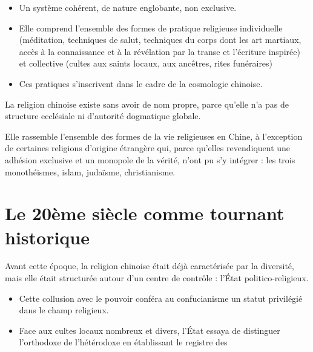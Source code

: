 \begin{Ex}
    
\end{Ex}

\begin{Ex}
    
\end{Ex}


\begin{Def}
    \begin{itemize}
        \item 	Un système cohérent, de nature englobante, non exclusive.
\item 	Elle comprend l’ensemble des formes de pratique religieuse individuelle (méditation, techniques de salut, techniques du corps dont les art martiaux, accès à la connaissance et à la révélation par la transe et l’écriture inspirée) et collective (cultes aux saints locaux, aux ancêtres, rites funéraires)
\item 	Ces pratiques s’inscrivent dans le cadre de la cosmologie chinoise.

    \end{itemize}
\end{Def}

\begin{Prop}
La religion chinoise existe sans avoir de nom propre, parce qu’elle n’a pas de structure ecclésiale ni d’autorité dogmatique globale.


\end{Prop}

Elle rassemble l’ensemble des formes de la vie religieuses en Chine, à l’exception de certaines religions d’origine étrangère qui, parce qu’elles revendiquent une adhésion exclusive et un monopole de la vérité, n’ont pu s’y intégrer : les trois monothéismes, islam, judaïsme, christianisme. 

\section{Le 20ème siècle comme tournant historique}
 

Avant cette époque, la religion chinoise était déjà caractérisée par la diversité, mais elle était structurée autour d’un centre de contrôle : l’État politico-religieux.
\begin{itemize}

    \item  	Cette collusion avec le pouvoir conféra au confucianisme un statut privilégié dans le champ religieux.
    \item	Face aux cultes locaux nombreux et divers, l’État essaya de distinguer l’orthodoxe de l’hétérodoxe en établissant le registre des  

  \end{itemize}

